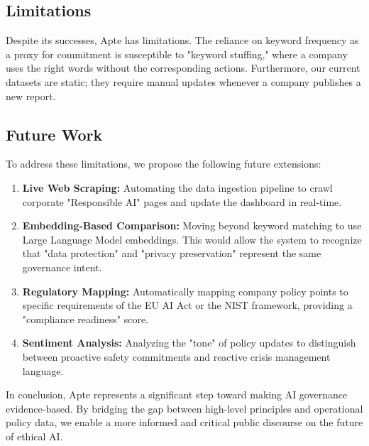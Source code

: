 \documentclass[conference]{IEEEtran}
\begin{document}
\subsection{Limitations}
Despite its successes, Apte has limitations. The reliance on keyword frequency as a proxy for commitment is susceptible to "keyword stuffing," where a company uses the right words without the corresponding actions. Furthermore, our current datasets are static; they require manual updates whenever a company publishes a new report.

\subsection{Future Work}
To address these limitations, we propose the following future extensions:
\begin{enumerate}
    \item \textbf{Live Web Scraping:} Automating the data ingestion pipeline to crawl corporate "Responsible AI" pages and update the dashboard in real-time.
    \item \textbf{Embedding-Based Comparison:} Moving beyond keyword matching to use Large Language Model embeddings. This would allow the system to recognize that "data protection" and "privacy preservation" represent the same governance intent.
    \item \textbf{Regulatory Mapping:} Automatically mapping company policy points to specific requirements of the EU AI Act or the NIST framework, providing a "compliance readiness" score.
    \item \textbf{Sentiment Analysis:} Analyzing the "tone" of policy updates to distinguish between proactive safety commitments and reactive crisis management language.
\end{enumerate}

In conclusion, Apte represents a significant step toward making AI governance evidence-based. By bridging the gap between high-level principles and operational policy data, we enable a more informed and critical public discourse on the future of ethical AI.

\balance
\end{document}
